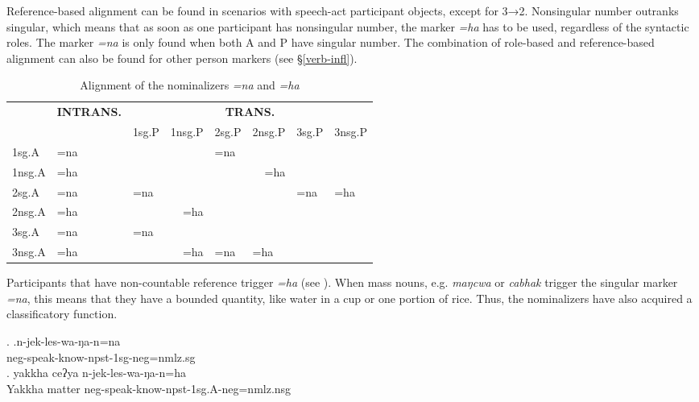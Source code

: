 Reference-based alignment can be found in scenarios with speech-act participant objects, except for 3→2. Nonsingular number outranks singular, which means that as soon as one participant has nonsingular number, the marker \emph{=ha} has to be used, regardless of the syntactic roles. The marker \emph{=na} is only found when both A and P have singular number. The combination of role-based and reference-based alignment can also be found for other person markers (see §\ref{verb-infl}).

	
\begin{table}[htp]
\begin{center} 
\begin{tabular}{|l||l|l|l|l|l|l|l|}
\hline
		& {\bf INTRANS.}&	\multicolumn{6}{c|}{ {\bf TRANS.}} \\
	\cline{3-8}
		&		&{\sc 1sg.P}& {\sc 1nsg.P}&{\sc 2sg.P}&{\sc 2nsg.P}&{\sc 3sg.P}&{\sc 3nsg.P}\\
\hline
\hline
 {\sc 1sg.A} 		& =na& \multicolumn{2}{c|}{\cellcolor[gray]{.8}}&=na& & &\\
 \cline{1-2} \cline{5-5} 		
{\sc 1nsg.A} 		&=ha & \multicolumn{2}{c|}{\cellcolor[gray]{.8}}&\multicolumn{2}{r|}{=ha}&&\\
 \cline{1-6}
{\sc 2sg.A} 		&=na&=na	&&\multicolumn{2}{c|}{\cellcolor[gray]{.8}} &=na&=ha\\
\cline{1-3}
{\sc 2nsg.A}		&=ha&	\multicolumn{2}{r|}{=ha} &\multicolumn{2}{c|}{\cellcolor[gray]{.8}} &&\\ 
 \cline{1-6}
{\sc 3sg.A}		&=na&=na&& & &&\\
\cline{1-3}
{\sc 3nsg.A}	& =ha&\multicolumn{2}{r|}{=ha}&=na  &=ha&&\\
\hline
\end{tabular}
\caption{Alignment of the nominalizers \emph{=na} and \emph{=ha}}\label{nmlz-uni-table}
\end{center}
\end{table}     

Participants that have non-countable reference trigger \emph{=ha} (see \Next). When mass nouns, e.g. \emph{maŋcwa}  or \emph{cabhak}  trigger the singular marker \emph{=na}, this means that they have a bounded quantity, like water in a cup or one portion of rice. Thus, the nominalizers have also acquired a classificatory function.


\ex. \ag.n-jek-les-wa-ŋa-n=na\\
		{\sc neg}-speak-know{\sc -npst-1sg-neg=nmlz.sg} 	\\
 	\bg. yakkha ceʔya n-jek-les-wa-ŋa-n=ha\\
	Yakkha matter {\sc neg}-speak-know{\sc -npst-1sg.A-neg=nmlz.nsg} 		\\
	

